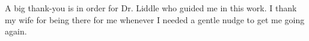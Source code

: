 \label{acknowledgements}
A big thank-you is in order for Dr. Liddle who guided me in this work. I thank my wife for being there for me whenever I needed a gentle nudge to get me going again.

